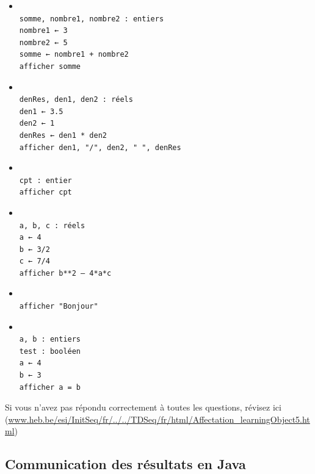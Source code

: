 \documentclass[11pt,a4paper]{article}
\begin{document}
            \begin{itemize} 
        
            \item[ \ding{"6F} ] \begin{verbatim}

somme, nombre1, nombre2 : entiers 
nombre1 ← 3 
nombre2 ← 5 
somme ← nombre1 + nombre2
afficher somme\end{verbatim}
        
            \item[ \ding{"6F} ] \begin{verbatim}

denRes, den1, den2 : réels 
den1 ← 3.5 
den2 ← 1 
denRes ← den1 * den2
afficher den1, "/", den2, " ", denRes \end{verbatim}
        
            \item[ \ding{"6F} ] \begin{verbatim}
						
cpt : entier 
afficher cpt\end{verbatim}
        
            \item[ \ding{"6F} ] \begin{verbatim}
						
a, b, c : réels 
a ← 4 
b ← 3/2 
c ← 7/4 
afficher b**2 – 4*a*c\end{verbatim}
        
            \item[ \ding{"6F} ] \begin{verbatim}
						
afficher "Bonjour"\end{verbatim}
        
            \item[ \ding{"6F} ] \begin{verbatim}
						
a, b : entiers 
test : booléen 
a ← 4 
b ← 3 
afficher a = b\end{verbatim}
        
            \end{itemize} 
        Si vous n'avez pas r\'epondu correctement \`a toutes les questions, 
        r\'evisez ici (\url{www.heb.be/esi/InitSeq/fr/../../TDSeq/fr/html/Affectation\_learningObject5.html})
            \par
        \subsection{Communication des r\'esultats en Java}
			
\end{document}
